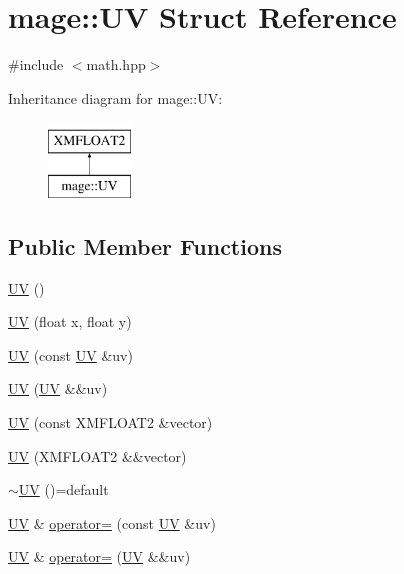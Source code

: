 \hypertarget{structmage_1_1_u_v}{}\section{mage\+:\+:UV Struct Reference}
\label{structmage_1_1_u_v}


{\ttfamily \#include $<$math.\+hpp$>$}

Inheritance diagram for mage\+:\+:UV\+:\begin{figure}[H]
\begin{center}
\leavevmode
\includegraphics[height=2.000000cm]{structmage_1_1_u_v}
\end{center}
\end{figure}
\subsection*{Public Member Functions}
\begin{DoxyCompactItemize}
\item 
\hyperlink{structmage_1_1_u_v_a777c466d20ed20386326299d373b4cb8}{UV} ()
\item 
\hyperlink{structmage_1_1_u_v_adc915f36ebb2dede57f2ddfd130e9321}{UV} (float x, float y)
\item 
\hyperlink{structmage_1_1_u_v_a3e31395f3be9fc757040bc242b72fe1f}{UV} (const \hyperlink{structmage_1_1_u_v}{UV} \&uv)
\item 
\hyperlink{structmage_1_1_u_v_ac26053e28b94c8ec7e5bc5df8b52d4eb}{UV} (\hyperlink{structmage_1_1_u_v}{UV} \&\&uv)
\item 
\hyperlink{structmage_1_1_u_v_a9aa55008cd8f18f25817209198cf0ec2}{UV} (const X\+M\+F\+L\+O\+A\+T2 \&vector)
\item 
\hyperlink{structmage_1_1_u_v_a0598ac5e5ec1b4bc3c48fe619f63fbef}{UV} (X\+M\+F\+L\+O\+A\+T2 \&\&vector)
\item 
\hyperlink{structmage_1_1_u_v_a9389be8cc9bb64861b69f79b44b6dd1b}{$\sim$\+UV} ()=default
\item 
\hyperlink{structmage_1_1_u_v}{UV} \& \hyperlink{structmage_1_1_u_v_abb607259f1710f1344f83ebc21a1a5da}{operator=} (const \hyperlink{structmage_1_1_u_v}{UV} \&uv)
\item 
\hyperlink{structmage_1_1_u_v}{UV} \& \hyperlink{structmage_1_1_u_v_a78eb969d0ff66360614b82aeaf6395aa}{operator=} (\hyperlink{structmage_1_1_u_v}{UV} \&\&uv)
\end{DoxyCompactItemize}


